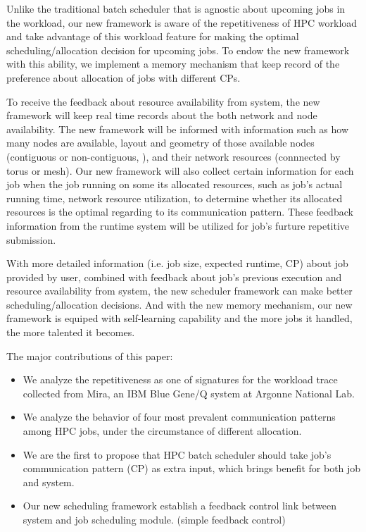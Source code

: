 \documentclass[conference]{IEEEtran}
\begin{document}
Unlike the traditional batch scheduler that is agnostic about upcoming jobs in the workload, our new framework is aware of the repetitiveness of HPC workload and take advantage of this workload feature for making the optimal scheduling/allocation decision for upcoming jobs. To endow the new framework with this ability, we implement a memory mechanism that keep record of the preference about allocation of jobs with different CPs.

To receive the feedback about resource availability from system, the new framework will keep real time records about the both network and node availability. The new framework will be informed with information such as how many nodes are available, layout and geometry of those available nodes  (contiguous or non-contiguous, ), and their network resources (connnected by torus or mesh). Our new framework will also collect certain information for each job when the job running on some its allocated resources, such as job's actual running time, network resource utilization, to determine whether its allocated resources is the optimal regarding to its communication pattern. These feedback information from the runtime system will be utilized for job's furture repetitive submission.

With more detailed information (i.e. job size, expected runtime, CP) about job provided by user, combined with feedback about job's previous execution and resource availability from system, the new scheduler framework can make better scheduling/allocation decisions. And with the new memory mechanism, our new framework is equiped with self-learning capability and the more jobs it handled, the more talented it becomes.


The major contributions of this paper:
\begin{itemize}
    \item We analyze the repetitiveness as one of signatures for the workload trace collected from Mira, an IBM Blue Gene/Q system at Argonne National Lab.
    
    \item We analyze the behavior of four most prevalent communication patterns among HPC jobs, under the circumstance of different allocation.

    \item We are the first to propose that HPC batch scheduler should take job's communication pattern (CP) as extra input, which brings benefit for both job and system.
    
    \item Our new scheduling framework establish a feedback control link between system and job scheduling module. (simple feedback control) 
    
\end{itemize}
\end{document}
